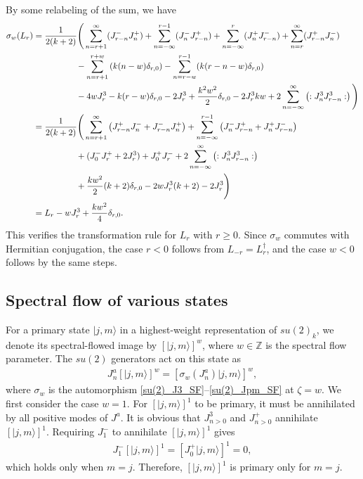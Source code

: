 \documentclass[11pt]{article}
\numberwithin{equation}{section}
\begin{document}
By some relabeling of the sum, we have 
\begin{align}
    \sigma_w(L_{r})&=\frac{1}{2(k+2)}\Bigg{(} \sum_{n=r+1}^{\infty}(J_{r-n}^- J_n^+) +\sum_{n=-\infty}^{r-1}(J_n^- J_{r-n}^+) +\sum_{n=-\infty}^{r}(J_n^+ J_{r-n}^-) +\sum_{n=r}^{\infty}(J_{r-n}^+J_{n}^-) \nonumber \\
    &\quad \quad \quad \quad \quad - \sum_{n=r+1}^{r+w}\left(k(n-w)\delta_{r,0}\right)
-\sum_{n=r-w}^{r-1}(k(r-n-w)\delta_{r,0})  \nonumber \\
&\quad \quad \quad \quad \quad-4wJ_r^3 - k(r-w)\delta_{r,0}-2J_r^3 +\frac{k^2w^2}{2}\delta_{r,0}-2J_r^3 kw +2\sum_{n=-\infty}^{\infty}\left(:J_{n}^3 J_{r-n}^3:\right) \Bigg{)}  \nonumber \\
&=\frac{1}{2(k+2)}\Bigg{(}\sum_{n=r+1}^{\infty} \left(J_{r-n}^+ J_n^{-}+J_{r-n}^- J_n^+ \right) +\sum_{n=-\infty}^{r-1}\left(J_n^-J_{r-n}^{+} +J_n^+ J_{r-n}^- \right) 
  \nonumber \\
&\quad \quad \quad \quad \quad +( J_{0}^- J_r^++2J_r^3)+J_0^+ J_r^- +2\sum_{n=-\infty}^{\infty}\left(:J_{n}^3 J_{r-n}^3:\right)  \nonumber \\
&\quad \quad \quad \quad \quad+\frac{kw^2}{2}(k+2)\delta_{r,0} -2wJ_r^3 (k+2) -2J_r^3\Bigg{)}\nonumber \\
&=L_{r}-wJ_r^3+\frac{kw^2}{4}\delta_{r,0}.
\end{align}
This verifies the transformation rule for $L_r$ with $r\geq0$. Since $\sigma_w$ commutes with Hermitian conjugation, the case $r<0$ follows from $L_{-r}=L_r^\dagger$, and the case $w<0$ follows by the same steps.

\subsection{Spectral flow of various states}
\label{SF_states}

For a primary state $|j,m\rangle$ in a highest-weight representation of $su(2)_k$, we denote its spectral-flowed image by $[|j,m\rangle]^w$, where $w\in\mathbb{Z}$ is the spectral flow parameter. The $su(2)$ generators act on this state as
\begin{align}
    J_n^a [|j,m\rangle]^w =[\sigma_w(J_n^a)|j,m\rangle]^w,
\end{align}
where $\sigma_w$ is the automorphism \eqref{su(2)_J3_SF}--\eqref{su(2)_Jpm_SF} at $\zeta=w$. We first consider the case $w=1$. For $[|j,m\rangle]^1$ to be primary, it must be annihilated by all positive modes of $J^a$. It is obvious that $J_{n>0}^3$ and $J_{n>0}^+$ annihilate $[|j,m\rangle]^1$. Requiring $J_{1}^{-}$ to annihilate $[|j,m\rangle]^1$ gives
\begin{align}
    J_{1}^{-}[|j,m\rangle]^1 =[J_0^+|j,m\rangle]^1=0,
\end{align}
which holds only when $m=j$. Therefore, $[|j,m\rangle]^1$ is primary only for $m=j$.
\end{document}
